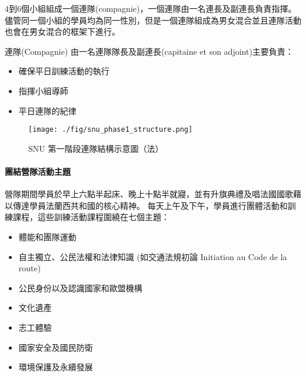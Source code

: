 \documentclass[a4paper,14pt]{extarticle}
\theoremstyle{plain}
\theoremstyle{remark}
\numberwithin{equation}{section}
\begin{document}
%

\par 
4到6個小組組成一個連隊(compagnie)，一個連隊由一名連長及副連長負責指揮。儘管同一個小組的學員均為同一性別，但是一個連隊組成為男女混合並且連隊活動也會在男女混合的框架下進行。

連隊(Compagnie) 由一名連隊隊長及副連長(capitaine et son adjoint)主要負責：
\begin{itemize}
	\item 確保平日訓練活動的執行
	\item 指揮小組導師
	\item 平日連隊的紀律
\end{itemize}

\begin{figure}
	\centering
	\texttt{[image: ./fig/snu\_phase1\_structure.png]}
	\caption{SNU 第一階段連隊結構示意圖（法）}
\end{figure}


\paragraph{團結營隊活動主題}

營隊期間學員於早上六點半起床、晚上十點半就寢\cite{info-jeunes-snu}，並有升旗典禮及唱法國國歌藉以傳達學員法蘭西共和國的核心精神。
每天上午及下午，學員進行團體活動和訓練課程，這些訓練活動課程圍繞在七個主題：
\begin{itemize}
	\item 體能和團隊運動
	\item 自主獨立、公民法權和法律知識 (如交通法規初論 Initiation au Code de la route)
	\item  公民身份以及認識國家和歐盟機構 %
	\item 文化遺產    %
	\item 志工體驗 %
	\item 國家安全及國民防衛 %
\item 環境保護及永續發展 %
\end{itemize}
\end{document}
